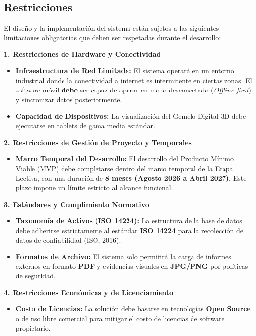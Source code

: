 \subsection{Restricciones}
El diseño y la implementación del sistema están sujetos a las siguientes limitaciones obligatorias que deben ser respetadas durante el desarrollo:

\textbf{1. Restricciones de Hardware y Conectividad}
\begin{itemize}
    \item \textbf{Infraestructura de Red Limitada:} El sistema operará en un entorno industrial donde la conectividad a internet es intermitente en ciertas zonas. El software móvil \textbf{debe} ser capaz de operar en modo desconectado (\textit{Offline-first}) y sincronizar datos posteriormente.
    \item \textbf{Capacidad de Dispositivos:} La visualización del Gemelo Digital 3D debe ejecutarse en tablets de gama media estándar.
\end{itemize}

\textbf{2. Restricciones de Gestión de Proyecto y Temporales}
\begin{itemize}
    \item \textbf{Marco Temporal del Desarrollo:} El desarrollo del Producto Mínimo Viable (MVP) debe completarse dentro del marco temporal de la Etapa Lectiva, con una duración de \textbf{8 meses (Agosto 2026 a Abril 2027)}. Este plazo impone un límite estricto al alcance funcional.
\end{itemize}

\textbf{3. Estándares y Cumplimiento Normativo}
\begin{itemize}
    \item \textbf{Taxonomía de Activos (ISO 14224):} La estructura de la base de datos debe adherirse estrictamente al estándar \textbf{ISO 14224} para la recolección de datos de confiabilidad (ISO, 2016).
    \item \textbf{Formatos de Archivo:} El sistema solo permitirá la carga de informes externos en formato \textbf{PDF} y evidencias visuales en \textbf{JPG/PNG} por políticas de seguridad.
\end{itemize}

\textbf{4. Restricciones Económicas y de Licenciamiento}
\begin{itemize}
    \item \textbf{Costo de Licencias:} La solución debe basarse en tecnologías \textbf{Open Source} o de uso libre comercial para mitigar el costo de licencias de software propietario.
\end{itemize}

